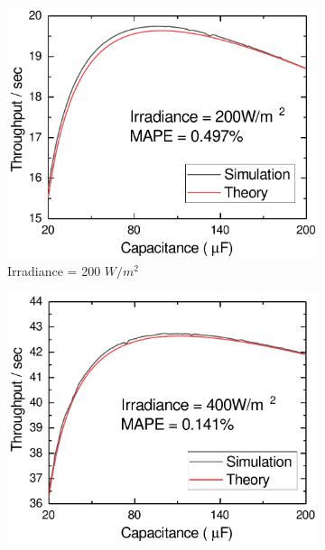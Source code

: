 
\begin{figure}[H]
    \centering
    \begin{subfigure}{0.325\textwidth}
        \centering
        \includegraphics[width=\textwidth]{figure/work1/veriTheory200}
        \caption{Irradiance = 200 $W/m^2$}
    \end{subfigure}
    \begin{subfigure}{0.325\textwidth}
        \centering
        \includegraphics[width=\textwidth]{figure/work1/veriTheory400}

\end{subfigure}
\end{figure}
